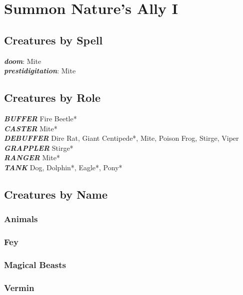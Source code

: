 \newpage

\def \levelnnumsummons{1}

\chapter{Summon Nature's Ally I}
\newpage

\section{Creatures by Spell}

\vspace{5pt}

\textbf{\textit{doom}}: Mite \\
\textbf{\textit{prestidigitation}}: Mite \\

\newpage

\section{Creatures by Role}

\vspace{5pt}

\textbf{\textit{BUFFER}} Fire Beetle* \\

\textbf{\textit{CASTER}} Mite* \\

\textbf{\textit{DEBUFFER}} Dire Rat, Giant Centipede*, Mite, Poison Frog, Stirge, Viper \\

\textbf{\textit{GRAPPLER}} Stirge* \\

\textbf{\textit{RANGER}} Mite* \\

\textbf{\textit{TANK}} Dog, Dolphin*, Eagle*, Pony* \\

\newpage

\section{Creatures by Name} 

\subsection{Animals}







\subsection{Fey}

\subsection{Magical Beasts}

\subsection{Vermin}


